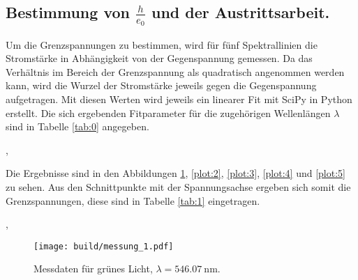 
\subsection{\texorpdfstring{Bestimmung von $\frac{h}{e_0}$ und der Austrittsarbeit}{Bestimmung von h/e und der Austrittsarbeit}.}

Um die Grenzspannungen zu bestimmen, wird für fünf Spektrallinien die Stromstärke in Abhängigkeit von der Gegenspannung gemessen.
Da das Verhältnis im Bereich der Grenzspannung als quadratisch angenommen werden kann, wird die Wurzel der Stromstärke jeweils gegen die Gegenspannung aufgetragen.
Mit diesen Werten wird jeweils ein linearer Fit mit SciPy in Python erstellt.
Die sich ergebenden Fitparameter für die zugehörigen Wellenlängen $\lambda$ sind in Tabelle \ref{tab:0} angegeben.

,

Die Ergebnisse sind in den Abbildungen \ref{plot:1}, \ref{plot:2}, \ref{plot:3}, \ref{plot:4} und \ref{plot:5} zu sehen.
Aus den Schnittpunkte mit der Spannungsachse ergeben sich somit die Grenzspannungen, diese sind in Tabelle \ref{tab:1} eingetragen.

,

\begin{figure}
  \centering
  \texttt{[image: build/messung\_1.pdf]}
  \caption{Messdaten für grünes Licht, $\lambda = \SI{546,07}{\nano\metre}$.}
  \label{plot:1}
\end{figure}

